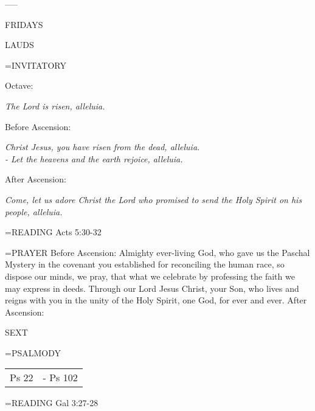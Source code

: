 -----
\begin{center}
\normalsize FRIDAYS
\end{center}

\begin{flushleft}\normalsize LAUDS\\\end{flushleft}
\hangindent=\parindent \small{INVITATORY}
\begin{center}
\end{center}Octave:\begin{center}\textit{	The Lord is risen, alleluia.\\}
\end{center}Before Ascension:\begin{center}\textit{	Christ Jesus, you have risen from the dead, alleluia.\\}
\textit{			- Let the heavens and the earth rejoice, alleluia.\\}
\end{center}After Ascension:\begin{center}\textit{	Come, let us adore Christ the Lord who promised to send the Holy Spirit on his people, alleluia.\\}
\end{center}

\hangindent=\parindent \small{READING}    Acts 5:30-32 \textbf{   \\}

\hangindent=\parindent \small{PRAYER }
Before Ascension:	Almighty ever-living God, who gave us the Paschal Mystery in the covenant you established for reconciling the human race, so dispose our minds, we pray, that what we celebrate by professing the faith we may express in deeds. Through our Lord Jesus Christ, your Son, who lives and reigns with you in the unity of the Holy Spirit, one God, for ever and ever.
After Ascension:	

\begin{flushleft}\normalsize SEXT\\\end{flushleft}
\hangindent=\parindent \small{PSALMODY}
\begin{center}
\begin{tabular}{ l l }
Ps 22 &  - Ps 102\\
\end{tabular}
\end{center}		

\hangindent=\parindent \small{READING}    Gal 3:27-28 \textbf{   }

